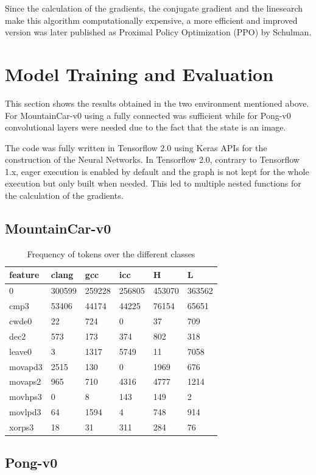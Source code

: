 \documentclass[12pt,a4paper]{article}
\begin{document}
Since the calculation of the gradients, the conjugate gradient and the linesearch make this algorithm computationally expensive, a more efficient and improved version was later published as Proximal Policy Optimization (PPO) by Schulman.

\section{Model Training and Evaluation}
 
This section shows the results obtained in the two environment mentioned above. For MountainCar-v0 using a fully connected was sufficient while for Pong-v0 convolutional layers were needed due to the fact that the state is an image.

The code was fully written in Tensorflow 2.0 using Keras APIs for the construction of the Neural Networks. In Tensorflow 2.0, contrary to Tensorflow 1.x, eager execution is enabled by default and the graph is not kept for the whole execution but only built when needed. This led to multiple nested functions for the calculation of the gradients.
\subsection{MountainCar-v0}


\begin{table}[H]
\centering
\begin{tabular}{llllll}
\hline
feature & clang  & gcc    & icc    & H      & L      \\ \hline
0       & 300599 & 259228 & 256805 & 453070 & 363562 \\
cmp3    & 53406  & 44174  & 44225  & 76154  & 65651  \\
cwde0   & 22     & 724    & 0      & 37     & 709    \\
dec2    & 573    & 173    & 374    & 802    & 318    \\
leave0  & 3      & 1317   & 5749   & 11     & 7058   \\
movapd3 & 2515   & 130    & 0      & 1969   & 676    \\
movaps2 & 965    & 710    & 4316   & 4777   & 1214   \\
movhps3 & 0      & 8      & 143    & 149    & 2      \\
movlpd3 & 64     & 1594   & 4      & 748    & 914    \\
xorps3  & 18     & 31     & 311    & 284    & 76     \\ \hline
\end{tabular}
\caption{Frequency of tokens over the different classes}
\label{tab:features-frequencies}
\end{table}
\subsection{Pong-v0}
\end{document}
